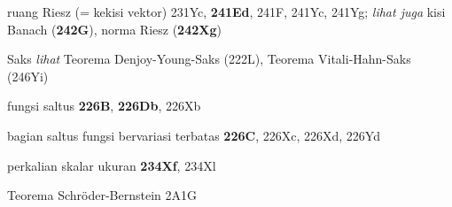 ruang Riesz (= kekisi vektor) 231Yc, {\bf 241Ed}, 241F,
241Yc, 241Yg; 
  {\it lihat juga}
kisi Banach ({\bf 242G}),
norma Riesz ({\bf 242Xg})





















































\indexmedskip

Saks {\it lihat} Teorema Denjoy-Young-Saks (222L),
Teorema Vitali-Hahn-Saks (246Yi)






fungsi saltus {\bf 226B}, {\bf 226Db}, 226Xb


bagian saltus fungsi bervariasi terbatas {\bf 226C},
226Xc, 226Xd, 226Yd




















perkalian skalar ukuran {\bf 234Xf}, 234Xl












Teorema Schr\"oder-Bernstein 2A1G



